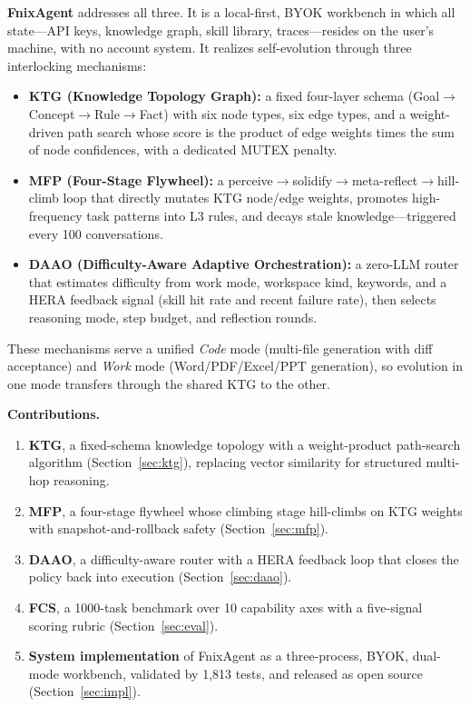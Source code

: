 \documentclass[sigconf]{acmart}
\begin{document}
\textbf{FnixAgent} addresses all three. It is a local-first, BYOK workbench in which all state---API keys, knowledge graph, skill library, traces---resides on the user's machine, with no account system. It realizes self-evolution through three interlocking mechanisms:

\begin{itemize}
  \item \textbf{KTG (Knowledge Topology Graph):} a fixed four-layer schema (Goal$\rightarrow$Concept$\rightarrow$Rule$\rightarrow$Fact) with six node types, six edge types, and a weight-driven path search whose score is the product of edge weights times the sum of node confidences, with a dedicated MUTEX penalty.
  \item \textbf{MFP (Four-Stage Flywheel):} a perceive$\rightarrow$solidify$\rightarrow$meta-reflect$\rightarrow$hill-climb loop that directly mutates KTG node/edge weights, promotes high-frequency task patterns into L3 rules, and decays stale knowledge---triggered every 100 conversations.
  \item \textbf{DAAO (Difficulty-Aware Adaptive Orchestration):} a zero-LLM router that estimates difficulty from work mode, workspace kind, keywords, and a HERA feedback signal (skill hit rate and recent failure rate), then selects reasoning mode, step budget, and reflection rounds.
\end{itemize}

These mechanisms serve a unified \emph{Code} mode (multi-file generation with diff acceptance) and \emph{Work} mode (Word/PDF/Excel/PPT generation), so evolution in one mode transfers through the shared KTG to the other.

\textbf{Contributions.}
\begin{enumerate}
  \item \textbf{KTG}, a fixed-schema knowledge topology with a weight-product path-search algorithm (Section~\ref{sec:ktg}), replacing vector similarity for structured multi-hop reasoning.
  \item \textbf{MFP}, a four-stage flywheel whose climbing stage hill-climbs on KTG weights with snapshot-and-rollback safety (Section~\ref{sec:mfp}).
  \item \textbf{DAAO}, a difficulty-aware router with a HERA feedback loop that closes the policy back into execution (Section~\ref{sec:daao}).
  \item \textbf{FCS}, a 1000-task benchmark over 10 capability axes with a five-signal scoring rubric (Section~\ref{sec:eval}).
  \item \textbf{System implementation} of FnixAgent as a three-process, BYOK, dual-mode workbench, validated by 1{,}813 tests, and released as open source (Section~\ref{sec:impl}).
\end{enumerate}
\end{document}
